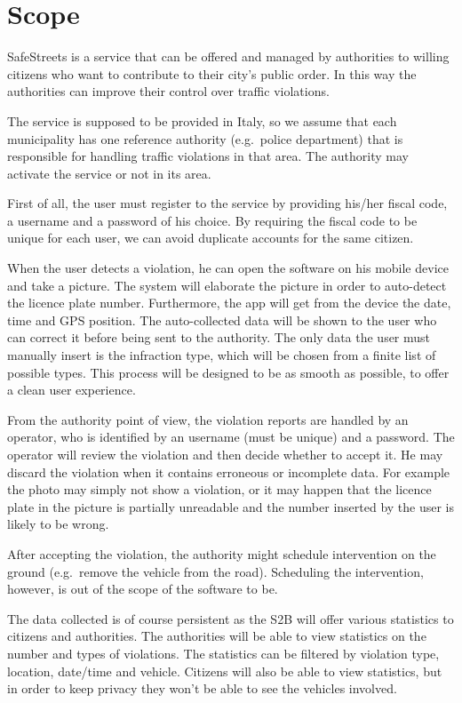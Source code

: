 \section{Scope}
SafeStreets is a service that can be offered and managed by authorities
to willing citizens who want to contribute to their city’s public order.
In this way the authorities can improve their control over traffic violations.

The service is supposed to be provided in Italy, so we assume that each
municipality has one reference authority (e.g.\ police department) that is
responsible for handling traffic violations in that area.
The authority may activate the service or not in its area.

First of all, the user must register to the service by providing his/her 
fiscal code, a username and a password of his choice.
By requiring the fiscal code to be unique for each user, we can avoid
duplicate accounts for the same citizen.

When the user detects a violation, he can open the software on his mobile 
device and take a picture. The system will elaborate the picture in order to 
auto-detect the licence plate number. Furthermore, the app will get from the 
device the date, time and GPS position. The auto-collected data will be shown 
to the user who can correct it before being sent to the authority.
The only data the user must manually insert is the infraction type, which 
will be chosen from a finite list of possible types.
This process will be designed to be as smooth as possible, to offer a clean 
user experience.

From the authority point of view, the violation reports are handled by
an operator, who is identified by an username (must be unique) and
a password.
The operator will review the violation and then decide whether to accept it.
He may discard the violation when it contains erroneous or incomplete data.
For example the photo may simply not show a violation, or it may happen that
the licence plate in the picture is partially unreadable and the number
inserted by the user is likely to be wrong.

After accepting the violation, the authority might schedule intervention
on the ground (e.g.\ remove the vehicle from the road).
Scheduling the intervention, however, is out of the scope of the software
to be.

The data collected is of course persistent as the S2B will offer various
statistics to citizens and authorities.
The authorities will be able to view statistics on the number and types of
violations.
The statistics can be filtered by violation type, location, date/time and
vehicle.
Citizens will also be able to view statistics, but in order to keep privacy
they won't be able to see the vehicles involved.

